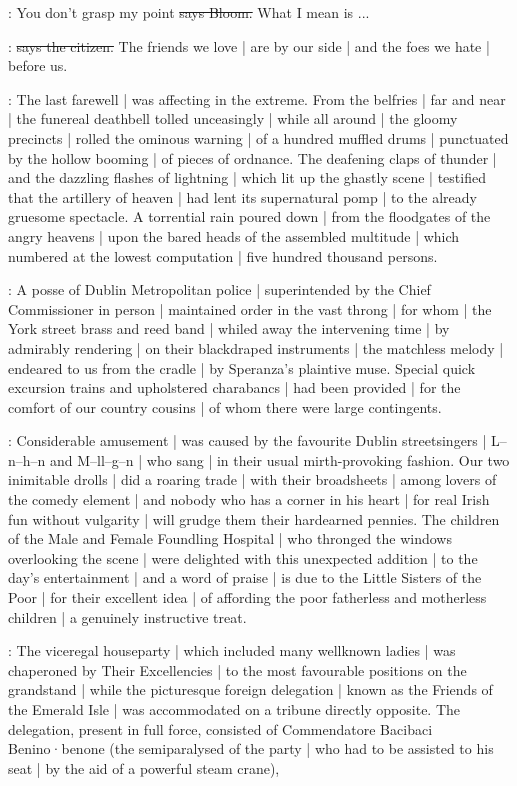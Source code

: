 \Bloom:
You don't grasp my point
\sout{says Bloom.}
What I mean is ...

\citizen:
\sout{says the citizen.}
The friends we love |
are by our side |
and the foes we hate |
before us.

:
The last farewell |
was affecting in the extreme.
From the belfries |
far and near |
the funereal deathbell tolled unceasingly |
while all around |
the gloomy precincts |
rolled the ominous warning |
of a hundred muffled drums |
punctuated by the hollow booming |
of pieces of ordnance.
The deafening claps of thunder |
and the dazzling flashes of lightning |
which lit up the ghastly scene |
testified that the artillery of heaven |
had lent its supernatural pomp |
to the already gruesome spectacle.
A torrential rain poured down |
from the floodgates of the angry heavens |
upon the bared heads of the assembled multitude |
which numbered at the lowest computation |
five hundred thousand persons.

:
A posse of Dublin Metropolitan police |
superintended by the Chief Commissioner in person |
maintained order in the vast throng |
for whom |
the York street brass and reed band |
whiled away the intervening time |
by admirably rendering |
on their blackdraped instruments |
the matchless melody |
endeared to us from the cradle |
by Speranza's plaintive muse.
Special quick excursion trains and upholstered charabancs |
had been provided |
for the comfort of our country cousins |
of whom there were large contingents.

:
Considerable amusement |
was caused by the favourite Dublin streetsingers |
L–n–h–n and M–ll–g–n |
who sang  |
in their usual mirth-provoking fashion.
Our two inimitable drolls |
did a roaring trade |
with their broadsheets |
among lovers of the comedy element |
and nobody who has a corner in his heart |
for real Irish fun without vulgarity |
will grudge them their hardearned pennies.
The children of the Male and Female Foundling Hospital |
who thronged the windows overlooking the scene |
were delighted with this unexpected addition |
to the day's entertainment |
and a word of praise |
is due to the Little Sisters of the Poor |
for their excellent idea |
of affording the poor fatherless and motherless children |
a genuinely instructive treat.

:
The viceregal houseparty |
which included many wellknown ladies |
was chaperoned by Their Excellencies |
to the most favourable positions on the grandstand |
while the picturesque foreign delegation |
known as the Friends of the Emerald Isle |
was accommodated on a tribune directly opposite.
The delegation,
present in full force,
consisted of Commendatore Bacibaci Benino·benone
(the semiparalysed  of the party |
who had to be assisted to his seat |
by the aid of a powerful steam crane),

